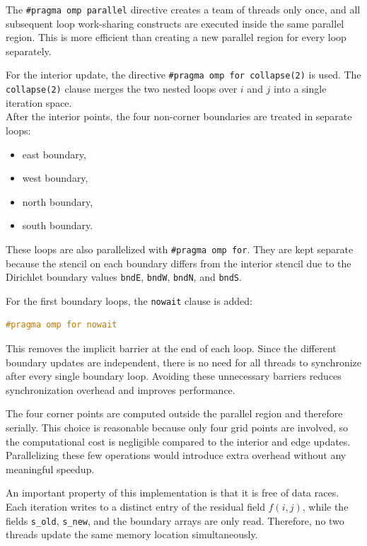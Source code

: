 \documentclass[unicode,10pt,a4paper,oneside,numbers=endperiod,openany]{scrartcl}
\begin{document}
The \texttt{\#pragma omp parallel} directive creates a team of threads only once, and all subsequent loop work-sharing constructs are executed inside the same parallel region.  
This is more efficient than creating a new parallel region for every loop separately.

For the interior update, the directive \texttt{\#pragma omp for collapse(2)} is used.  
The \texttt{collapse(2)} clause merges the two nested loops over \(i\) and \(j\) into a single iteration space.\\

After the interior points, the four non-corner boundaries are treated in separate loops:
\begin{itemize}
    \item east boundary,
    \item west boundary,
    \item north boundary,
    \item south boundary.
\end{itemize}
These loops are also parallelized with \texttt{\#pragma omp for}.  
They are kept separate because the stencil on each boundary differs from the interior stencil due to the Dirichlet boundary values \texttt{bndE}, \texttt{bndW}, \texttt{bndN}, and \texttt{bndS}.

For the first boundary loops, the \texttt{nowait} clause is added:
\begin{lstlisting}[language=C++,style=grayverbatim]
#pragma omp for nowait
\end{lstlisting}
This removes the implicit barrier at the end of each loop.  
Since the different boundary updates are independent, there is no need for all threads to synchronize after every single boundary loop.  
Avoiding these unnecessary barriers reduces synchronization overhead and improves performance.

The four corner points are computed outside the parallel region and therefore serially.  
This choice is reasonable because only four grid points are involved, so the computational cost is negligible compared to the interior and edge updates.  
Parallelizing these few operations would introduce extra overhead without any meaningful speedup.

An important property of this implementation is that it is free of data races.  
Each iteration writes to a distinct entry of the residual field \(f(i,j)\), while the fields \texttt{s\_old}, \texttt{s\_new}, and the boundary arrays are only read.  
Therefore, no two threads update the same memory location simultaneously.
\end{document}
